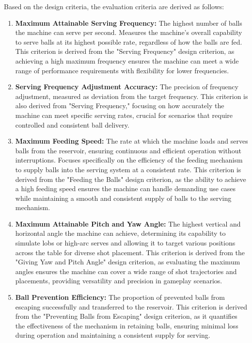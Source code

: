 \documentclass[12pt]{article}
\begin{document}
Based on the design criteria, the evaluation criteria are derived as follows:
\begin{enumerate}
    \item \textbf{Maximum Attainable Serving Frequency:} The highest number of balls the machine can serve per second. Measures the machine's overall capability to serve balls at its highest possible rate, regardless of how the balls are fed. This criterion is derived from the "Serving Frequency" design criterion, as achieving a high maximum frequency ensures the machine can meet a wide range of performance requirements with flexibility for lower frequencies.

    \item \textbf{Serving Frequency Adjustment Accuracy:} The precision of frequency adjustment, measured as deviation from the target frequency. This criterion is also derived from "Serving Frequency," focusing on how accurately the machine can meet specific serving rates, crucial for scenarios that require controlled and consistent ball delivery.

    \item \textbf{Maximum Feeding Speed:} The rate at which the machine loads and serves balls from the reservoir, ensuring continuous and efficient operation without interruptions. Focuses specifically on the efficiency of the feeding mechanism to supply balls into the serving system at a consistent rate. This criterion is derived from the "Feeding the Balls" design criterion, as the ability to achieve a high feeding speed ensures the machine can handle demanding use cases while maintaining a smooth and consistent supply of balls to the serving mechanism.

    \item \textbf{Maximum Attainable Pitch and Yaw Angle:} The highest vertical and horizontal angle the machine can achieve, determining its capability to simulate lobs or high-arc serves and allowing it to target various positions across the table for diverse shot placement. This criterion is derived from the "Giving Yaw and Pitch Angle" design criterion, as evaluating the maximum angles ensures the machine can cover a wide range of shot trajectories and placements, providing versatility and precision in gameplay scenarios.


    \item \textbf{Ball Prevention Efficiency:} The proportion of prevented balls from escaping successfully and transferred to the reservoir. This criterion is derived from the "Preventing Balls from Escaping" design criterion, as it quantifies the effectiveness of the mechanism in retaining balls, ensuring minimal loss during operation and maintaining a consistent supply for serving.


\end{enumerate}
\end{document}
